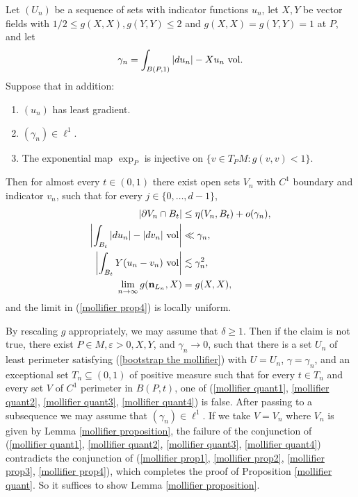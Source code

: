 \begin{lemma}\label{mollifier proposition}
Let $(U_n)$ be a sequence of sets with indicator functions $u_n$, let $X, Y$ be vector fields with $1/2 \leq g(X, X), g(Y, Y) \leq 2$ and $g(X, X) = g(Y, Y) = 1$ at $P$, and let
$$\gamma_n = \int_{B(P, 1)} |du_n| - Xu_n ~\mathrm{vol}.$$
Suppose that in addition:
\begin{enumerate}
\item $(u_n)$ has least gradient.
\item $(\gamma_n) \in \ell^1$.
\item The exponential map $\exp_P$ is injective on $\{v \in T_PM: g(v, v) < 1\}$.
\end{enumerate}

Then for almost every $t \in (0, 1)$ there exist open sets $V_n$ with $C^1$ boundary and indicator $v_n$, such that for every $j \in \{0, \dots, d - 1\}$,
\begin{align}
|\partial V_n \cap B_t| &\leq \eta(V_n, B_t) + o(\gamma_n), \label{mollifier prop1}\\
\left|\int_{B_t} |du_n| - |dv_n| ~\mathrm{vol}\right| &\ll \gamma_n, \label{mollifier prop2}\\
\left|\int_{B_t} Y(u_n - v_n)~\mathrm{vol}\right| &\lesssim \gamma_n^2, \label{mollifier prop3}\\
\lim_{n \to \infty} g(\mathbf n_{L_n}, X) &= g(X, X), \label{mollifier prop4}
\end{align}
and the limit in (\ref{mollifier prop4}) is locally uniform.
\end{lemma}

By rescaling $g$ appropriately, we may assume that $\delta \geq 1$.
Then if the claim is not true, there exist $P \in M, \varepsilon > 0, X, Y$, and $\gamma_n \to 0$, such that there is a set $U_n$ of least perimeter satisfying (\ref{bootstrap the mollifier}) with $U = U_n$, $\gamma = \gamma_n$, and an exceptional set $T_n \subseteq (0, 1)$ of positive measure such that for every $t \in T_n$ and every set $V$ of $C^1$ perimeter in $B(P, t)$, one of (\ref{mollifier quant1}, \ref{mollifier quant2}, \ref{mollifier quant3}, \ref{mollifier quant4}) is false.
After passing to a subsequence we may assume that $(\gamma_n) \in \ell^1$.
If we take $V = V_n$ where $V_n$ is given by Lemma \ref{mollifier proposition}, the failure of the conjunction of (\ref{mollifier quant1}, \ref{mollifier quant2}, \ref{mollifier quant3}, \ref{mollifier quant4}) contradicts the conjunction of (\ref{mollifier prop1}, \ref{mollifier prop2}, \ref{mollifier prop3}, \ref{mollifier prop4}), which completes the proof of Proposition \ref{mollifier quant}.
So it suffices to show Lemma \ref{mollifier proposition}.

